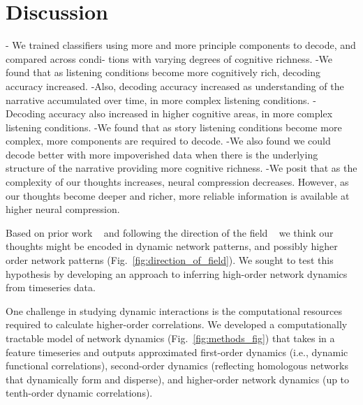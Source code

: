 \documentclass[english]{article}
\begin{document}


\section*{Discussion}


- We trained classifiers using more and more principle components to decode, and compared across condi- tions with varying degrees of cognitive richness.
-We found that as listening conditions become more cognitively rich,
decoding accuracy increased.
-Also, decoding accuracy increased as understanding of the narrative
accumulated over time, in more complex listening conditions.
- Decoding accuracy also increased in higher cognitive areas, in more complex listening conditions.
-We found that as story listening conditions become more complex, more
components are required to decode.
-We also found we could decode better with more impoverished data when
there is the underlying structure of the narrative providing more cognitive richness.
-We posit that as the complexity of our thoughts increases, neural
compression decreases. However, as our thoughts become deeper and richer, more reliable information is available at higher neural compression.







Based on prior work ~\citep{Deme19} and following the direction of the field ~\citep{Turk13} we think our thoughts might be encoded in
dynamic network patterns, and possibly higher order network
patterns (Fig.~\ref{fig:direction_of_field}). We sought to test this hypothesis by developing an approach
to inferring high-order network dynamics from timeseries data. 

One challenge in studying dynamic interactions is the
computational resources required to calculate higher-order correlations. 
We developed a computationally tractable model of network dynamics (Fig.~\ref{fig:methods_fig}) that takes in a feature
timeseries and outputs approximated first-order dynamics (i.e.,
dynamic functional correlations), second-order dynamics
(reflecting homologous networks that dynamically form and disperse),
and higher-order network dynamics (up to tenth-order dynamic
correlations).
\end{document}
